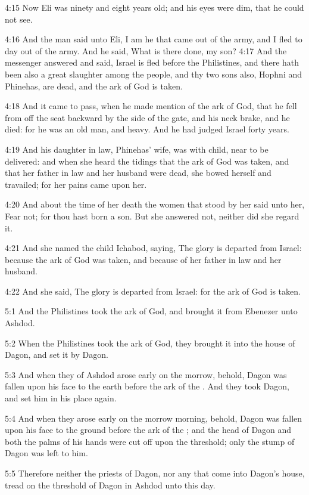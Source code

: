 4:15 Now Eli was ninety and eight years old; and his eyes were dim, that he could not see.

4:16 And the man said unto Eli, I am he that came out of the army, and I fled to day out of the army. And he said, What is there done, my son?  4:17 And the messenger answered and said, Israel is fled before the Philistines, and there hath been also a great slaughter among the people, and thy two sons also, Hophni and Phinehas, are dead, and the ark of God is taken.

4:18 And it came to pass, when he made mention of the ark of God, that he fell from off the seat backward by the side of the gate, and his neck brake, and he died: for he was an old man, and heavy. And he had judged Israel forty years.

4:19 And his daughter in law, Phinehas' wife, was with child, near to be delivered: and when she heard the tidings that the ark of God was taken, and that her father in law and her husband were dead, she bowed herself and travailed; for her pains came upon her.

4:20 And about the time of her death the women that stood by her said unto her, Fear not; for thou hast born a son. But she answered not, neither did she regard it.

4:21 And she named the child Ichabod, saying, The glory is departed from Israel: because the ark of God was taken, and because of her father in law and her husband.

4:22 And she said, The glory is departed from Israel: for the ark of God is taken.

5:1 And the Philistines took the ark of God, and brought it from Ebenezer unto Ashdod.

5:2 When the Philistines took the ark of God, they brought it into the house of Dagon, and set it by Dagon.

5:3 And when they of Ashdod arose early on the morrow, behold, Dagon was fallen upon his face to the earth before the ark of the \LORD. And they took Dagon, and set him in his place again.

5:4 And when they arose early on the morrow morning, behold, Dagon was fallen upon his face to the ground before the ark of the \LORD; and the head of Dagon and both the palms of his hands were cut off upon the threshold; only the stump of Dagon was left to him.

5:5 Therefore neither the priests of Dagon, nor any that come into Dagon's house, tread on the threshold of Dagon in Ashdod unto this day.

